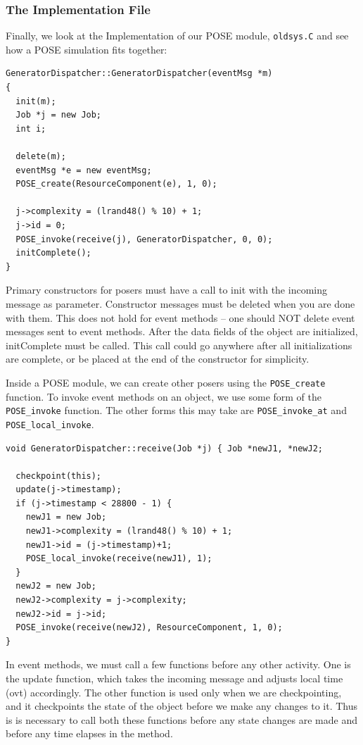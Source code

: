 \documentclass[10pt]{article}
\begin{document}
\subsubsection{The Implementation File}

Finally, we look at the Implementation of our POSE module,
{\tt oldsys.C} and see how a POSE simulation fits together: 

\begin{verbatim}
GeneratorDispatcher::GeneratorDispatcher(eventMsg *m)
{
  init(m);
  Job *j = new Job;
  int i;

  delete(m);
  eventMsg *e = new eventMsg;
  POSE_create(ResourceComponent(e), 1, 0);

  j->complexity = (lrand48() % 10) + 1;
  j->id = 0;
  POSE_invoke(receive(j), GeneratorDispatcher, 0, 0);
  initComplete();
}
\end{verbatim}

Primary constructors for posers must have a call to init with the incoming
message as parameter.  Constructor messages must be deleted when you are done
with them.  This does not hold for event methods -- one should NOT delete
event messages sent to event methods.  After the data fields of the object are
initialized, initComplete must be called.  This call could go anywhere after
all initializations are complete, or be placed at the end of the constructor
for simplicity. 

Inside a POSE module, we can create other posers using the \verb|POSE_create|
function.  To invoke event methods on an object, we use some form of the
\verb|POSE_invoke| function.  The other forms this may take are
\verb|POSE_invoke_at| and
\verb|POSE_local_invoke|.  

\begin{verbatim}
void GeneratorDispatcher::receive(Job *j) { Job *newJ1, *newJ2;

  checkpoint(this);
  update(j->timestamp);
  if (j->timestamp < 28800 - 1) {
    newJ1 = new Job;
    newJ1->complexity = (lrand48() % 10) + 1;
    newJ1->id = (j->timestamp)+1;
    POSE_local_invoke(receive(newJ1), 1);
  }
  newJ2 = new Job;
  newJ2->complexity = j->complexity;
  newJ2->id = j->id;
  POSE_invoke(receive(newJ2), ResourceComponent, 1, 0);
}
\end{verbatim}

In event methods, we must call a few functions before any other activity.  One
is the update function, which takes the incoming message and adjusts local
time (ovt) accordingly.  The other function is used only when we are
checkpointing, and it checkpoints the state of the object before we make any
changes to it.  Thus is is necessary to call both these functions before any
state changes are made and before any time elapses in the method. 
\end{document}

